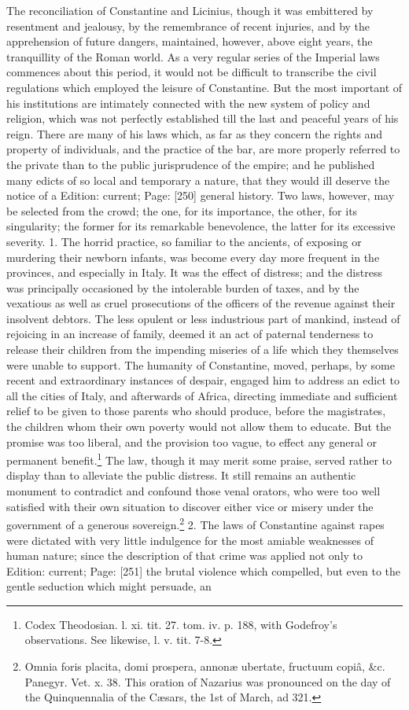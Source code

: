 The reconciliation of Constantine and Licinius, though it was embittered by resentment and jealousy, by the remembrance of recent injuries, and by the apprehension of future dangers, maintained, however, above eight years, the tranquillity of the Roman world. As a very regular series of the Imperial laws commences about this period, it would not be difficult to transcribe the civil regulations which employed the leisure of Constantine. But the most important of his institutions are intimately connected with the new system of policy and religion, which was not perfectly established till the last and peaceful years of his reign. There are many of his laws which, as far as they concern the rights and property of individuals, and the practice of the bar, are more properly referred to the private than to the public jurisprudence of the empire; and he published many edicts of so local and temporary a nature, that they would ill deserve the notice of a Edition: current; Page: [250] general history. Two laws, however, may be selected from the crowd; the one, for its importance, the other, for its singularity; the former for its remarkable benevolence, the latter for its excessive severity. 1. The horrid practice, so familiar to the ancients, of exposing or murdering their newborn infants, was become every day more frequent in the provinces, and especially in Italy. It was the effect of distress; and the distress was principally occasioned by the intolerable burden of taxes, and by the vexatious as well as cruel prosecutions of the officers of the revenue against their insolvent debtors. The less opulent or less industrious part of mankind, instead of rejoicing in an increase of family, deemed it an act of paternal tenderness to release their children from the impending miseries of a life which they themselves were unable to support. The humanity of Constantine, moved, perhaps, by some recent and extraordinary instances of despair, engaged him to address an edict to all the cities of Italy, and afterwards of Africa, directing immediate and sufficient relief to be given to those parents who should produce, before the magistrates, the children whom their own poverty would not allow them to educate. But the promise was too liberal, and the provision too vague, to effect any general or permanent benefit.\footnote{Codex Theodosian. l. xi. tit. 27. tom. iv. p. 188, with Godefroy\texthebrew{}’s observations. See likewise, l. v. tit. 7-8.} The law, though it may merit some praise, served rather to display than to alleviate the public distress. It still remains an authentic monument to contradict and confound those venal orators, who were too well satisfied with their own situation to discover either vice or misery under the government of a generous sovereign.\footnote{Omnia foris placita, domi prospera, annonæ ubertate, fructuum copiâ, \&c. Panegyr. Vet. x. 38. This oration of Nazarius was pronounced on the day of the Quinquennalia of the Cæsars, the 1st of March, ad 321.} 2. The laws of Constantine against rapes were dictated with very little indulgence for the most amiable weaknesses of human nature; since the description of that crime was applied not only to Edition: current; Page: [251] the brutal violence which compelled, but even to the gentle seduction which might persuade, an 